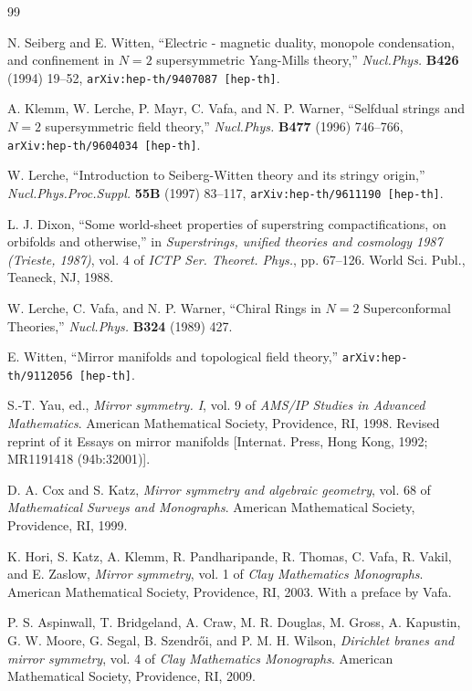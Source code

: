 \begin{thebibliography}{99}


N. Seiberg and E. Witten, ``Electric - magnetic duality, monopole condensation, and
confinement in $N=2$ supersymmetric Yang-Mills theory,'' \textit{Nucl.Phys.} \textbf{B426}
(1994) 19--52, \texttt{arXiv:hep-th/9407087 [hep-th]}.

A. Klemm, W. Lerche, P. Mayr, C. Vafa, and N. P. Warner, ``Selfdual strings and $N=2$
supersymmetric field theory,'' \textit{Nucl.Phys.} \textbf{B477} (1996) 746--766,
\texttt{arXiv:hep-th/9604034 [hep-th]}.

W. Lerche, ``Introduction to Seiberg-Witten theory and its stringy origin,''
\textit{Nucl.Phys.Proc.Suppl.} \textbf{55B} (1997) 83--117,
\texttt{arXiv:hep-th/9611190 [hep-th]}.

L. J. Dixon, ``Some world-sheet properties of superstring compactifications, on orbifolds
and otherwise,'' in \textit{Superstrings, unified theories and cosmology 1987 (Trieste,
1987)}, vol. 4 of \textit{ICTP Ser. Theoret. Phys.}, pp. 67--126. World Sci. Publ.,
Teaneck, NJ, 1988.

W. Lerche, C. Vafa, and N. P. Warner, ``Chiral Rings in $N=2$ Superconformal Theories,''
\textit{Nucl.Phys.} \textbf{B324} (1989) 427.


E. Witten, ``Mirror manifolds and topological field theory,''
\texttt{arXiv:hep-th/9112056 [hep-th]}.

S.-T. Yau, ed., \textit{Mirror symmetry. I}, vol. 9 of \textit{AMS/IP Studies in Advanced
Mathematics}. American Mathematical Society, Providence, RI, 1998. Revised reprint of it
Essays on mirror manifolds [Internat. Press, Hong Kong, 1992; MR1191418 (94b:32001)].

D. A. Cox and S. Katz, \textit{Mirror symmetry and algebraic geometry}, vol. 68 of
\textit{Mathematical Surveys and Monographs}. American Mathematical Society, Providence,
RI, 1999.

K. Hori, S. Katz, A. Klemm, R. Pandharipande, R. Thomas, C. Vafa, R. Vakil, and E. Zaslow,
\textit{Mirror symmetry}, vol. 1 of \textit{Clay Mathematics Monographs}. American
Mathematical Society, Providence, RI, 2003. With a preface by Vafa.

P. S. Aspinwall, T. Bridgeland, A. Craw, M. R. Douglas, M. Gross, A. Kapustin, G. W. Moore,
G. Segal, B. Szendr\H{o}i, and P. M. H. Wilson, \textit{Dirichlet branes and mirror
symmetry}, vol. 4 of \textit{Clay Mathematics Monographs}. American Mathematical Society,
Providence, RI, 2009.


\end{thebibliography}
